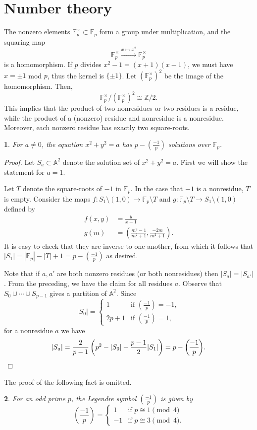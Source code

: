 \documentclass[10pt,a4paper]{amsart}
\numberwithin{equation}{section}
\numberwithin{figure}{section}
\theoremstyle{definition}
\theoremstyle{remark}
\theoremstyle{plain}
\theoremstyle{plain}
\theoremstyle{definition}
\theoremstyle{plain}
\newtheorem{prop}{\protect\propositionname}[section]
\theoremstyle{plain}
\providecommand{\propositionname}{Proposition}
\newcommand{\legendre}[2]{\genfrac{(}{)}{}{}{#1}{#2}}
\begin{document}
\section{Number theory}
The nonzero elements $\mathbb{F}^\times_p \subset \mathbb{F}_p$ form a group under multiplication, and the squaring map
\[
	\mathbb{F}^\times_p \xrightarrow{x \mapsto x^2} \mathbb{F}^\times_p
\]
is a homomorphism. If $p$ divides $x^2 - 1 = (x+1)(x-1)$, we must have $x = \pm 1$ mod $p$, thus the kernel is $\{\pm 1\}$. Let $(\mathbb{F}^\times_p)^2$ be the image of the homomorphism. Then,
\[
	\mathbb{F}^\times_p / (\mathbb{F}^\times_p)^2 \cong \mathbb{Z}/2.
\]
This implies that the product of two nonresidues or two residues is a residue, while the product of a (nonzero) residue and nonresidue is a nonresidue. Moreover, each nonzero residue has exactly two square-roots.
\begin{prop}\label{prop:circle-solutions}
	For $a \neq 0$, the equation $x^2 + y^2 = a$ has $p - \legendre{-1}{p}$ solutions over $\mathbb{F}_p$.
\end{prop}
\begin{proof}
	Let $S_a \subset \mathbb{A}^2$ denote the solution set of $x^2 + y^2 = a$. First we will show the statement for $a=1$.
	
	Let $T$ denote the square-roots of $-1$ in $\mathbb{F}_p$. In the case that $-1$ is a nonresidue, $T$ is empty. Consider the maps $f\colon S_1 \setminus (1,0) \to \mathbb{F}_p \setminus T$ and $g\colon \mathbb{F}_p \setminus T \to S_1 \setminus (1,0)$ defined by
	\begin{align*}
		f(x,y) &= \frac{y}{x-1}\\
		g(m) &= \left(\frac{m^2 - 1}{m^2 + 1}, \frac{-2m}{m^2 + 1}\right).
	\end{align*}
	It is easy to check that they are inverse to one another, from which it follows that $|S_1| = |\mathbb{F}_p| - |T| + 1 = p - \legendre{-1}{p}$ as desired.
	
	Note that if $a,a'$ are both nonzero residues (or both nonresidues) then $|S_a| = |S_{a'}|$. From the preceding, we have the claim for all residues $a$. Observe that $S_0 \cup \cdots \cup S_{p-1}$ gives a partition of $\mathbb{A}^2$. Since
	\[
		|S_0| = \left\{\begin{matrix}
			1 & \text{if }\legendre{-1}{p} = -1,\\
			2p+1 & \text{if }\legendre{-1}{p} = 1,
		\end{matrix}\right.
	\]
	for a nonresidue $a$ we have
	\[
		|S_a| = \frac{2}{p-1} \left(p^2 - |S_0| - \frac{p-1}{2}|S_1|\right) = p - \legendre{-1}{p}.\qedhere
	\]
\end{proof}
The proof of the following fact is omitted.
\begin{prop}
	For an odd prime $p$, the Legendre symbol $\legendre{-1}{p}$ is given by
	\[
		\legendre{-1}{p} = \left\{
			\begin{matrix}
				1 & \text{if } p \cong 1 \pmod 4 \\
				-1 & \text{if } p \cong 3 \pmod 4.
			\end{matrix}
		\right.
	\]
\end{prop}
\end{document}
